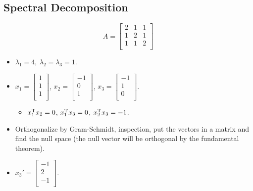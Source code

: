 \documentclass{article}
\begin{document}
\subsection*{Spectral Decomposition}
\begin{equation*}
    A =
    \begin{bmatrix}
        2 & 1 & 1\\
        1 & 2 & 1\\
        1 & 1 & 2\\
    \end{bmatrix}
\end{equation*}
\begin{itemize}
    \item $\lambda_1 = 4,\ \lambda_2=\lambda_3=1$.
    \item $
        x_1 =
        \begin{bmatrix}
            1\\
            1\\
            1\\
        \end{bmatrix}
    $, $
        x_2 =
        \begin{bmatrix}
            -1\\
            0\\
            1\\
        \end{bmatrix}
    $, $
        x_3 =
        \begin{bmatrix}
            -1\\
            1\\
            0\\
        \end{bmatrix}
    $.
    \begin{itemize}
        \item $x_1^{\text{T}} x_2 = 0$, $x_1^{\text{T}} x_3 = 0$, $x_2^{\text{T}} x_3 = -1$.
    \end{itemize}
    \item Orthogonalize by Gram-Schmidt, inspection, put the vectors in a matrix and find the null space (the null vector will be orthogonal by the fundamental theorem).
    \item $
        x_3' =
        \begin{bmatrix}
            -1\\
            2\\
            -1\\
        \end{bmatrix}
    $.
    \begin{itemize}

\end{itemize}
\end{itemize}
\end{document}
